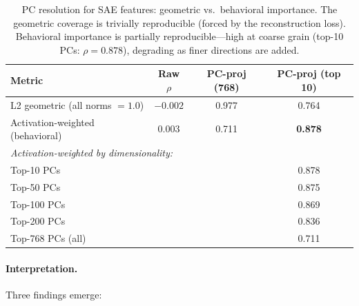 \documentclass{article}
\begin{document}
\begin{table}[ht]
\centering
\caption{PC resolution for SAE features: geometric vs.\ behavioral importance. The geometric coverage is trivially reproducible (forced by the reconstruction loss). Behavioral importance is partially reproducible---high at coarse grain (top-10 PCs: $\rho = 0.878$), degrading as finer directions are added.}
\label{tab:pc-resolution}
\small
\begin{tabular}{lccc}
\toprule
\textbf{Metric} & \textbf{Raw $\rho$} & \textbf{PC-proj (768)} & \textbf{PC-proj (top 10)} \\
\midrule
L2 geometric (all norms $= 1.0$) & $-0.002$ & 0.977 & 0.764 \\
Activation-weighted (behavioral) & 0.003 & 0.711 & \textbf{0.878} \\
\midrule
\multicolumn{4}{l}{\emph{Activation-weighted by dimensionality:}} \\
\quad Top-10 PCs & & & 0.878 \\
\quad Top-50 PCs & & & 0.875 \\
\quad Top-100 PCs & & & 0.869 \\
\quad Top-200 PCs & & & 0.836 \\
\quad Top-768 PCs (all) & & & 0.711 \\
\bottomrule
\end{tabular}
\end{table}

\paragraph{Interpretation.}
Three findings emerge:
\end{document}
